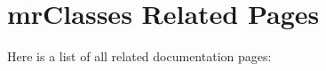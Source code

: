 \section{mr\-Classes Related Pages}
Here is a list of all related documentation pages:\begin{CompactList}
\item {}

\end{CompactList}
